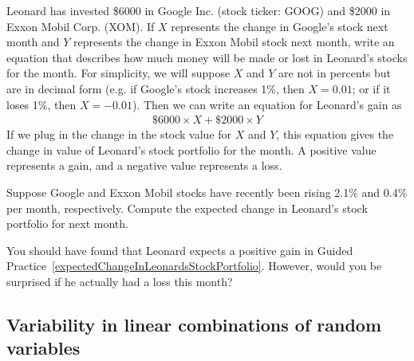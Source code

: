 \begin{examplewrap}
\begin{nexample}{Leonard has invested \$6000 in Google Inc. (stock ticker: GOOG) and \$2000 in Exxon Mobil Corp. (XOM). If $X$ represents the change in Google's stock next month and $Y$ represents the change in Exxon Mobil stock next month, write an equation that describes how much money will be made or lost in Leonard's stocks for the month.}
For simplicity, we will suppose $X$ and $Y$ are not in percents but are in decimal form (e.g. if Google's stock increases 1\%, then $X=0.01$; or if it loses 1\%, then $X=-0.01$). Then we can write an equation for Leonard's gain as
\begin{align*}
\$6000\times X + \$2000\times Y
\end{align*}
If we plug in the change in the stock value for $X$ and $Y$, this equation gives the change in value of Leonard's stock portfolio for the month. A positive value represents a gain, and a negative value represents a loss.
\end{nexample}
\end{examplewrap}

\begin{exercisewrap}
\begin{nexercise}\label{expectedChangeInLeonardsStockPortfolio}
Suppose Google and Exxon Mobil stocks have recently been rising 2.1\% and 0.4\% per month, respectively. Compute the expected change in Leonard's stock portfolio for next month.\footnotemark
\end{nexercise}
\end{exercisewrap}

\begin{exercisewrap}
\begin{nexercise}
You should have found that Leonard expects a positive gain in Guided Practice~\ref{expectedChangeInLeonardsStockPortfolio}. However, would you be surprised if he actually had a loss this month?\footnotemark
\end{nexercise}
\end{exercisewrap}

\subsection{Variability in linear combinations of random variables}
\label{variabilitylincomb}

